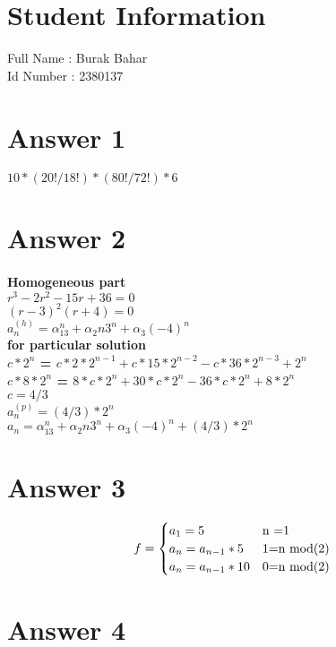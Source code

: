 \documentclass[11pt]{article}
\begin{document}
\section*{Student Information } 
Full Name :  Burak Bahar\\
Id Number :  2380137

\section*{Answer 1}
\paragraph{$10*(20!/18!)*(80!/72!)*6$}
\section*{Answer 2}
\paragraph{Homogeneous part\\$r^3-2r^2-15r+36=0$\\
$(r-3)^2(r+4)=0$\\
$a_n^(h) = \alpha_13^n + \alpha_2n3^n + \alpha_3(-4)^n$\\
for particular solution\\
$c*2^n$ = $c*2*2^{n-1} + c*15*2^{n-2}- c*36* 2^{n-3}+2^n$\\
$c*8*2^n$ = $8*c*2^n+30*c*2^n-36*c*2^n+8*2^n$\\
$c = 4/3$\\
$a_n^(p) = (4/3) *2^n$\\
$a_n=\alpha_13^n + \alpha_2n3^n + \alpha_3(-4)^n + (4/3) *2^n$
}
\section*{Answer 3}

\[ f=\begin{cases} 
      a_1 = 5 & $n =1$ \\
      a_n = a_{n-1}*5 & $1=n mod(2)$ \\
      a_n = a_{n-1}*10 & $0=n mod(2)$\\
   \end{cases}
\]

\section*{Answer 4}
\end{document}
